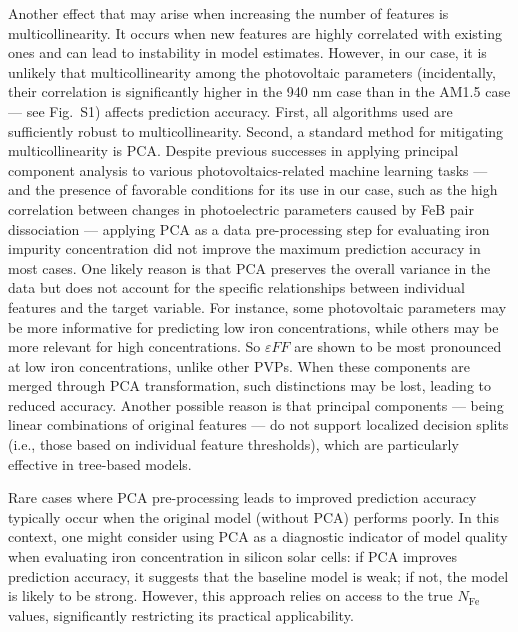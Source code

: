 \documentclass[a4paper,fleqn]{cas-sc}
\begin{document}
Another effect that may arise when increasing the number of features is multicollinearity.
It occurs when new features are highly correlated with existing ones and can lead to instability in model estimates.
However, in our case, it is unlikely that multicollinearity among the photovoltaic parameters
(incidentally, their correlation is significantly higher in the 940 nm case than in the AM1.5 case — see Fig.~S1)
affects prediction accuracy.
First, all algorithms used are sufficiently robust to multicollinearity.
Second, a standard method for mitigating multicollinearity is PCA.
Despite previous successes in applying principal component analysis to various
photovoltaics-related machine learning tasks \cite{AbdullahVetter2025, Fadhel2019, Gao2020,David2021,Liu2022} ---
and the presence of favorable conditions for its use in our case,
such as the high correlation between changes in photoelectric parameters caused by FeB pair dissociation ---
applying PCA as a data pre-processing step for evaluating iron impurity concentration did not improve the maximum prediction accuracy in most cases.
One likely reason is that PCA preserves the overall variance in the data
but does not account for the specific relationships between individual features and the target variable.
For instance, some photovoltaic parameters may be more informative for predicting low iron concentrations,
while others may be more relevant for high concentrations.
So $\varepsilon F\!F$ are shown \cite{Olikh2025MSEB} to be most pronounced at low iron concentrations, unlike other PVPs.
When these components are merged through PCA transformation, such distinctions may be lost, leading to reduced accuracy.
Another possible reason is that principal components ---
being linear combinations of original features --- do not support localized decision splits
(i.e., those based on individual feature thresholds), which are particularly effective in tree-based models.


Rare cases where PCA pre-processing leads to improved prediction accuracy typically
occur when the original model (without PCA) performs poorly.
In this context, one might consider using PCA as a diagnostic indicator of model quality
when evaluating iron concentration in silicon solar cells:
if PCA improves prediction accuracy, it suggests that the baseline model is weak;
if not, the model is likely to be strong.
However, this approach relies on access to the true $N_\mathrm{Fe}$ values,
significantly restricting its practical applicability.
\end{document}
